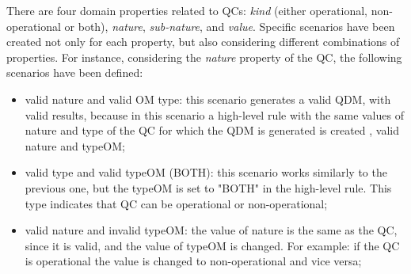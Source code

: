 There are four domain properties related to QCs:
\emph{kind} (either operational, non-operational or both),
\emph{nature}, \emph{sub-nature}, and \emph{value}. Specific scenarios have been created not only for each property, but also considering different
combinations of properties. For instance, considering the \emph{nature} property of the QC,
the following scenarios have been defined:

\begin{itemize}


\item valid nature and valid OM type: this scenario generates a valid QDM, with valid results, because in this scenario a high-level rule with the same values of nature and type of the QC for which the QDM is generated is created , valid nature and typeOM;


\item valid type and valid typeOM (BOTH): this scenario works similarly to the previous one, but the typeOM is set to "BOTH" in the high-level rule. This type indicates that QC can be operational or non-operational;


\item valid nature and invalid typeOM: the value of nature is the same as the QC, since it is valid, and the value of typeOM is changed. For example: if the QC is operational the value is changed to non-operational and vice versa;



\end{itemize}
